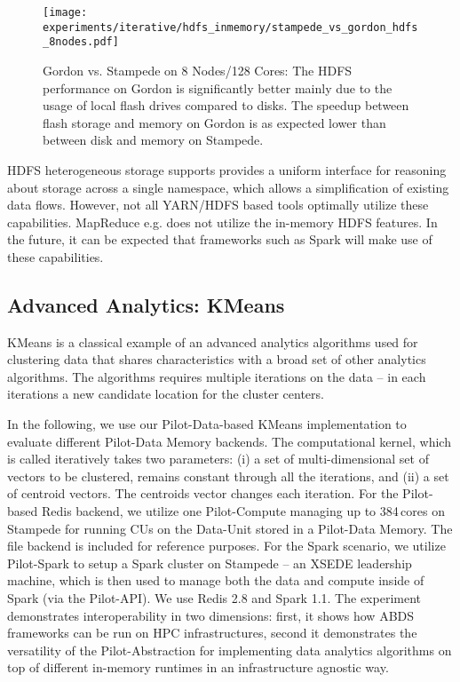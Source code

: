 \documentclass{sig-alternate}
\newcommand{\pilot}{Pilot\xspace}
\newcommand{\pilotcompute}{Pilot-Compute\xspace}
\newcommand{\pilotdata}{Pilot-Data\xspace}
\newcommand{\pilotdatainmem}{Pilot-Data Memory\xspace}
\newcommand{\dataunit}{Data-Unit\xspace}
\newcommand{\cus}{CUs\xspace}
\begin{document}
\begin{figure}[t]
    \centering
\texttt{[image: experiments/iterative/hdfs\_inmemory/stampede\_vs\_gordon\_hdfs\_8nodes.pdf]}
    \caption{Gordon vs. Stampede on 8 Nodes/128 Cores: The HDFS performance on 
    Gordon is significantly better mainly due to the usage of local flash 
    drives compared to disks. The speedup between flash storage and memory on 
    Gordon is as expected lower than between disk and memory on Stampede.}
\label{fig:experiments_iterative_hdfs_inmemory_stampede_vs_gordon_hdfs_8nodes}
\end{figure}



HDFS heterogeneous storage supports provides a uniform interface for reasoning
about storage across a single namespace, which allows a simplification of
existing data flows. However, not all YARN/HDFS based tools optimally utilize
these capabilities. MapReduce e.g. does not utilize the in-memory HDFS
features. In the future, it can be expected that frameworks such as Spark will
make use of these capabilities.



\subsection{Advanced Analytics: KMeans}

KMeans is a classical example of an advanced analytics algorithms used for
clustering data that shares characteristics with a broad set of other
analytics algorithms. The algorithms requires multiple iterations on
the data -- in each iterations a new candidate location for the
cluster centers.

In the following, we use our \pilotdata-based KMeans implementation
to evaluate different \pilotdatainmem backends. The
computational kernel, which is called iteratively takes two parameters: (i) a
set of multi-dimensional set of vectors to be clustered, remains constant
through all the iterations, and (ii) a set of centroid vectors. The centroids
vector changes each iteration. For the \pilot-based Redis backend, we utilize
one \pilotcompute managing up to 384\,cores on Stampede for running \cus on the
\dataunit stored in a \pilotdatainmem. The file backend is included for
reference purposes. For the Spark scenario, we utilize \pilot-Spark to setup a
Spark cluster on Stampede -- an XSEDE leadership machine, which is then used to
manage both the data and compute inside of Spark (via the \pilot-API). We use
Redis 2.8 and Spark 1.1. The experiment demonstrates interoperability in two
dimensions: first, it shows how ABDS frameworks can be run on HPC
infrastructures, second it demonstrates the versatility of the
\pilot-Abstraction for implementing data analytics algorithms on top of
different in-memory runtimes in an infrastructure agnostic way.
\end{document}
